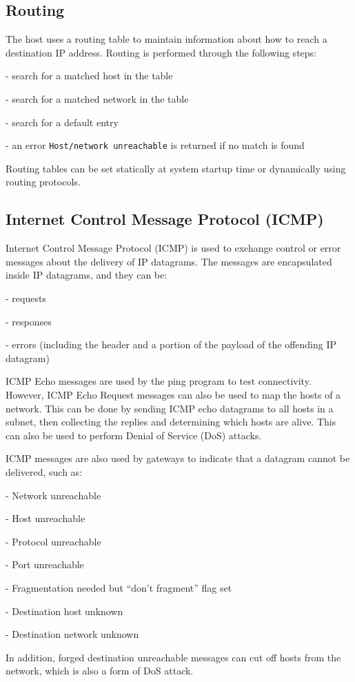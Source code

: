 \subsection{Routing}
The host uses a routing table to maintain information about how to reach a destination IP address. Routing is performed through the following steps:

- search for a matched host in the table 

- search for a matched network in the table 

- search for a default entry 

- an error \texttt{Host/network unreachable} is returned if no match is found 

Routing tables can be set statically at system startup time or dynamically using routing protocols. 

\subsection{Internet Control Message Protocol (ICMP)}
Internet Control Message Protocol (ICMP) is used to exchange control or error messages about the delivery of IP datagrams. The messages are encapsulated inside IP datagrams, and they can be:

- requests 

- responses 

- errors (including the header and a portion of the payload of the offending IP datagram) 

ICMP Echo messages are used by the ping program to test connectivity. However, ICMP Echo Request messages can also be used to map the hosts of a network. This can be done by sending ICMP echo datagrams to all hosts in a subnet, then collecting the replies and determining which hosts are alive. This can also be used to perform Denial of Service (DoS) attacks. 

ICMP messages are also used by gateways to indicate that a datagram cannot be delivered, such as:

- Network unreachable 

- Host unreachable 

- Protocol unreachable 

- Port unreachable 

- Fragmentation needed but “don’t fragment” flag set 

- Destination host unknown 

- Destination network unknown 

In addition, forged destination unreachable messages can cut off hosts from the network, which is also a form of DoS attack.

